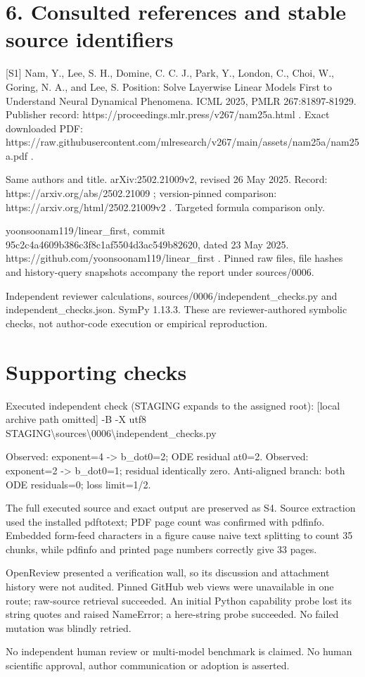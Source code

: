 \documentclass[10pt]{article}
\begin{document}
\section*{6. Consulted references and stable source identifiers}
[S1] Nam, Y., Lee, S. H., Domine, C. C. J., Park, Y., London, C., Choi, W., Goring, N. A., and Lee, S. Position: Solve Layerwise Linear Models First to Understand Neural Dynamical Phenomena. ICML 2025, PMLR 267:81897-81929. Publisher record: https://proceedings.mlr.press/v267/nam25a.html . Exact downloaded PDF: https://raw.githubusercontent.com/mlresearch/v267/main/assets/nam25a/nam25a.pdf .\par
Same authors and title. arXiv:2502.21009v2, revised 26 May 2025. Record: https://arxiv.org/abs/2502.21009 ; version-pinned comparison: https://arxiv.org/html/2502.21009v2 . Targeted formula comparison only.\par
yoonsoonam119/linear\_first, commit 95c2c4a4609b386c3f8c1af5504d3ac549b82620, dated 23 May 2025. https://github.com/yoonsoonam119/linear\_first . Pinned raw files, file hashes and history-query snapshots accompany the report under sources/0006.\par
Independent reviewer calculations, sources/0006/independent\_checks.py and independent\_checks.json. SymPy 1.13.3. These are reviewer-authored symbolic checks, not author-code execution or empirical reproduction.\par
\section*{Supporting checks}
Executed independent check (STAGING expands to the assigned root):
[local archive path omitted] -B -X utf8
STAGING\textbackslash{}sources\textbackslash{}0006\textbackslash{}independent\_checks.py\par
Observed: exponent=4 -> b\_dot0=2; ODE residual at0=2.
Observed: exponent=2 -> b\_dot0=1; residual identically zero.
Anti-aligned branch: both ODE residuals=0; loss limit=1/2.\par
The full executed source and exact output are preserved as S4. Source extraction used the installed pdftotext; PDF page count was confirmed with pdfinfo. Embedded form-feed characters in a figure cause naive text splitting to count 35 chunks, while pdfinfo and printed page numbers correctly give 33 pages.\par
OpenReview presented a verification wall, so its discussion and attachment history were not audited. Pinned GitHub web views were unavailable in one route; raw-source retrieval succeeded. An initial Python capability probe lost its string quotes and raised NameError; a here-string probe succeeded. No failed mutation was blindly retried.\par
No independent human review or multi-model benchmark is claimed. No human scientific approval, author communication or adoption is asserted.\par
\end{document}
